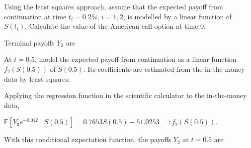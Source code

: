 Using the least squares approach, assume that the expected payoff from continuation at time $t_i=0.25i$, $i=1,2$, is modelled by a linear function of $S(t_i)$. Calculate the value of the American call option at time 0.

 Terminal payoffs $Y_3$ are

\noindent{}

At $t=0.5$, model the expected payoff from continuation as a linear function $f_2(S(0.5))$ of $S(0.5)$. Its coefficients are estimated from the in-the-money data by least squares:

\noindent{}

Applying the regression function in the scientific calculator to the in-the-money data,

$\mathbb E[Y_3e^{-0.012}\mid S(0.5)]
=0.7653S(0.5)-51.0253=:f_2(S(0.5))$.

With this conditional expectation function, the payoffs $Y_2$ at $t=0.5$ are

